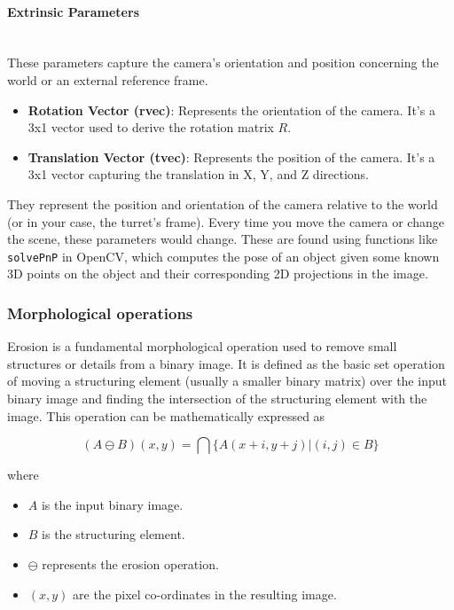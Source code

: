 \paragraph{Extrinsic Parameters}\mbox{}\\
These parameters capture the camera's orientation and position concerning the world or an external reference frame.

\begin{itemize}
    \item \textbf{Rotation Vector (rvec)}: Represents the orientation of the camera. It's a 3x1 vector used to derive the rotation matrix $ R $.

    \item \textbf{Translation Vector (tvec)}: Represents the position of the camera. It's a 3x1 vector capturing the translation in X, Y, and Z directions.
\end{itemize}

They represent the position and orientation of the camera relative to the world (or in your case, the turret's frame). Every time you move the camera or change the scene, these parameters would change. These are found using functions like \verb|solvePnP| in OpenCV, which computes the pose of an object given some known 3D points on the object and their corresponding 2D projections in the image.

\subsubsection{Morphological operations}
\label{subsubsec:morphological_operations}

Erosion is a fundamental morphological operation used to remove small structures or details from a binary image. It is defined as the basic set operation of moving a structuring element (usually a smaller binary matrix) over the input binary image and finding the intersection of the structuring element with the image. This operation can be mathematically expressed as

\begin{equation}
    (A \ominus B)(x, y) = \bigcap \{A(x + i, y + j) | (i, j) \in B\}
    \label{eq:erosion}
\end{equation}

where
\begin{itemize}
    \item $A$ is the input binary image.
    \item $B$ is the structuring element.
    \item $\ominus$ represents the erosion operation.
    \item $(x, y)$ are the pixel co-ordinates in the resulting image.
\end{itemize}

